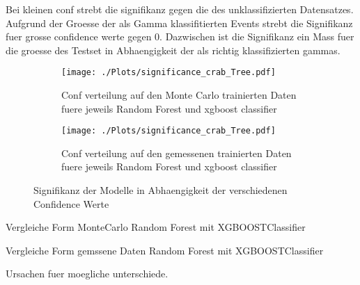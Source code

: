 Bei kleinen conf strebt die signifikanz gegen die des unklassifizierten Datensatzes.
Aufgrund der Groesse der als Gamma klassifitierten Events strebt die Signifikanz fuer grosse confidence werte gegen 0.
Dazwischen ist die Signifikanz ein Mass fuer die groesse des Testset in Abhaengigkeit der als richtig klassifizierten gammas.
\begin{figure}[H]
  \centering
  \begin{subfigure}[b]{0.48\textwidth}
  \centering
  \texttt{[image: ./Plots/significance\_crab\_Tree.pdf]}
  \caption{Conf verteilung auf den Monte Carlo trainierten Daten fuere jeweils Random Forest und xgboost classifier}
  \label{fig:signconfMC}
\end{subfigure}
\begin{subfigure}[b]{0.48\textwidth}
  \centering
  \texttt{[image: ./Plots/significance\_crab\_Tree.pdf]}
  \caption{Conf verteilung auf den gemessenen trainierten Daten fuere jeweils Random Forest und xgboost classifier}
  \label{fig:signconfMESS}
\end{subfigure}
\caption{Signifikanz der Modelle in Abhaengigkeit der verschiedenen Confidence Werte}
\label{fig:signconf}
\end{figure}

Vergleiche Form MonteCarlo Random Forest mit XGBOOSTClassifier 

Vergleiche Form gemssene Daten Random Forest mit XGBOOSTClassifier 

Ursachen fuer moegliche unterschiede.

